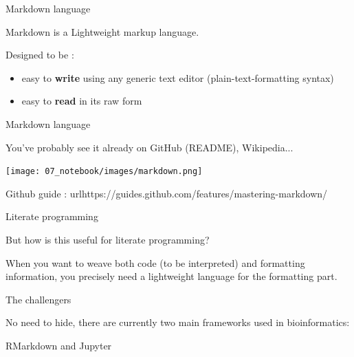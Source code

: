 \begin{frame}{Markdown language}

Markdown is a Lightweight markup language.

Designed to be :
\begin{itemize}
    \item easy to \textbf{write} using any generic text editor (plain-text-formatting syntax)
    \item easy to \textbf{read} in its raw form
\end{itemize}

\end{frame}

\begin{frame}{Markdown language}

You've probably see it already on GitHub (README), Wikipedia... 

\centering\texttt{[image: 07\_notebook/images/markdown.png]}

Github guide : url{https://guides.github.com/features/mastering-markdown/}
\end{frame}


%
%
%
%

\begin{frame}{Literate programming}

But how is this useful for literate programming? \newline

When you want to weave both code (to be interpreted) and formatting information, you precisely need a lightweight language for the formatting part.
\end{frame}

\begin{frame}{The challengers}

No need to hide, there are currently two main frameworks used in bioinformatics:

RMarkdown and Jupyter
\end{frame}

